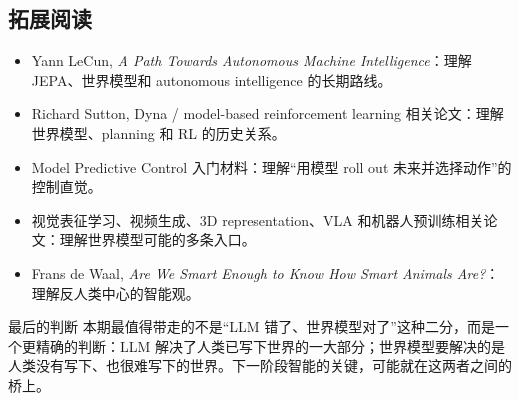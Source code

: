 \subsection{拓展阅读}

\begin{itemize}
\item Yann LeCun, \textit{A Path Towards Autonomous Machine Intelligence}：理解 JEPA、世界模型和 autonomous intelligence 的长期路线。
\item Richard Sutton, Dyna / model-based reinforcement learning 相关论文：理解世界模型、planning 和 RL 的历史关系。
\item Model Predictive Control 入门材料：理解“用模型 roll out 未来并选择动作”的控制直觉。
\item 视觉表征学习、视频生成、3D representation、VLA 和机器人预训练相关论文：理解世界模型可能的多条入口。
\item Frans de Waal, \textit{Are We Smart Enough to Know How Smart Animals Are?}：理解反人类中心的智能观。
\end{itemize}

\begin{importantbox}{最后的判断}
本期最值得带走的不是“LLM 错了、世界模型对了”这种二分，而是一个更精确的判断：LLM 解决了人类已写下世界的一大部分；世界模型要解决的是人类没有写下、也很难写下的世界。下一阶段智能的关键，可能就在这两者之间的桥上。
\end{importantbox}


